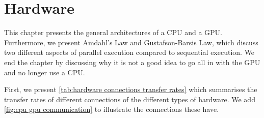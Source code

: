 \chapter{Hardware}
\label{chap:hardware}

This chapter presents the general architectures of a CPU and a GPU.
Furthermore, we present Amdahl's Law and Gustafson-Barsis Law, which discuss two different aspects of parallel execution compared to sequential execution.
We end the chapter by discussing why it is not a good idea to go all in with the GPU and no longer use a CPU.

First, we present \cref{tab:hardware connections transfer rates} which summarises the transfer rates of different connections of the different types of hardware.
We add \cref{fig:cpu gpu communication} to illustrate the connections these have.





